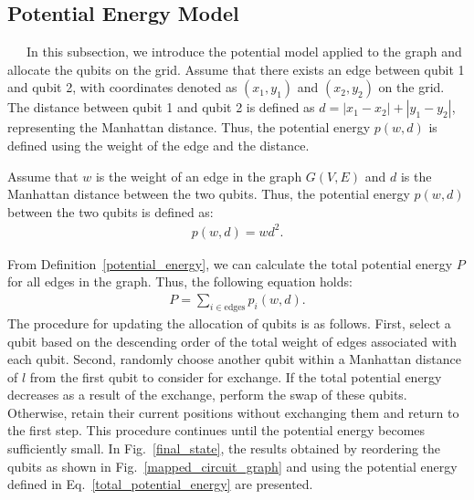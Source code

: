 \documentclass[a4paper,11pt]{ltjsarticle}
\begin{document}
{    \subsection{Potential Energy Model}{
        \ \ \ In this subsection, we introduce the potential model applied to the graph and allocate the qubits on the grid. Assume that there exists an edge between qubit 1 and qubit 2, with coordinates denoted as $(x_1, y_1)$ and $(x_2, y_2)$ on the grid. The distance between qubit 1 and qubit 2 is defined as $d = |x_1 - x_2| + |y_1 - y_2|$, representing the Manhattan distance. Thus, the potential energy $p(w, d)$ is defined using the weight of the edge and the distance.

        \begin{definition}\label{potential_energy}
            Assume that $w$ is the weight of an edge in the graph $G(V, E)$ and $d$ is the Manhattan distance between the two qubits. Thus, the potential energy $p(w, d)$ between the two qubits is defined as:
            \begin{align}\label{equation_of_potential_energy}
                p(w, d) = wd^2.
            \end{align}
        \end{definition}
        From Definition~\ref{potential_energy}, we can calculate the total potential energy $P$ for all edges in the graph. Thus, the following equation holds:
        \begin{align}\label{total_potential_energy}
            P = \sum_{i\in \text{edges}}p_i(w, d).
        \end{align}
        The procedure for updating the allocation of qubits is as follows. First, select a qubit based on the descending order of the total weight of edges associated with each qubit. Second, randomly choose another qubit within a Manhattan distance of $l$ from the first qubit to consider for exchange. If the total potential energy decreases as a result of the exchange, perform the swap of these qubits. Otherwise, retain their current positions without exchanging them and return to the first step. This procedure continues until the potential energy becomes sufficiently small. In Fig.~\ref{final_state}, the results obtained by reordering the qubits as shown in Fig.~\ref{mapped_circuit_graph} and using the potential energy defined in Eq.~\ref{total_potential_energy} are presented.

}}
\end{document}

